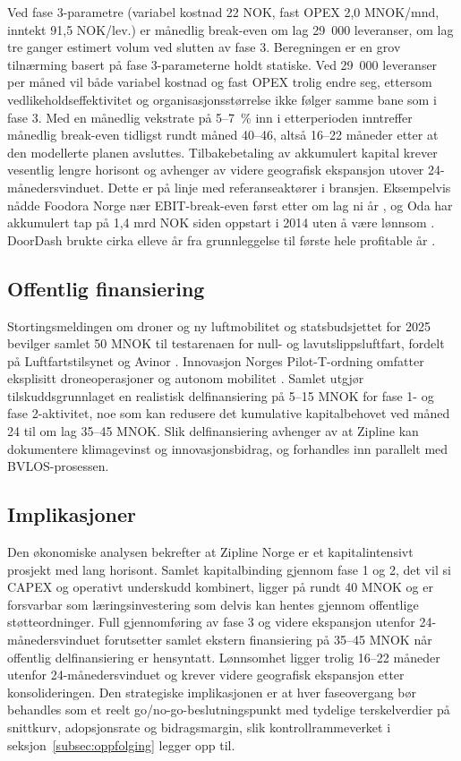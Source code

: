 Ved fase 3-parametre (variabel kostnad 22 NOK, fast OPEX 2{,}0 MNOK/mnd,
inntekt 91{,}5 NOK/lev.) er månedlig break-even om lag 29~000
leveranser, om lag tre ganger estimert volum ved slutten av fase 3.
Beregningen er en grov tilnærming basert på fase 3-parameterne holdt
statiske. Ved 29~000 leveranser per måned vil både variabel kostnad og
fast OPEX trolig endre seg, ettersom vedlikeholdseffektivitet og
organisasjonsstørrelse ikke følger samme bane som i fase 3. Med en
månedlig vekstrate på 5--7~\% inn i etterperioden inntreffer månedlig
break-even tidligst rundt måned 40--46, altså 16--22 måneder etter at
den modellerte planen avsluttes. Tilbakebetaling av akkumulert
kapital krever vesentlig lengre horisont og avhenger av videre
geografisk ekspansjon utover 24-måneders\-vinduet. Dette er på linje med
referanseaktører i bransjen. Eksempelvis nådde Foodora Norge nær
EBIT-break-even først etter om lag ni år
\parencite{purehelp2025_foodora}, og Oda har akkumulert tap på 1{,}4 mrd
NOK siden oppstart i 2014 uten å være lønnsom
\parencite{finansavisen2024_oda}. DoorDash brukte cirka elleve år fra
grunnleggelse til første hele profitable år \parencite{doordash2025}.

\subsection{Offentlig finansiering}

Stortingsmeldingen om droner og ny luftmobilitet og statsbudsjettet for
2025 bevilger samlet 50 MNOK til testarenaen for null- og
lavutslipps\-luftfart, fordelt på Luftfartstilsynet og Avinor
\parencite{prop1s2024, parat24_2024}. Innovasjon Norges Pilot-T-ordning
omfatter eksplisitt droneoperasjoner og autonom mobilitet
\parencite{innovasjonnorge2025_pilott}. Samlet utgjør
tilskudds\-grunnlaget en realistisk delfinansiering på 5--15 MNOK for
fase 1- og fase 2-aktivitet, noe som kan redusere det kumulative
kapital\-behovet ved måned 24 til om lag 35--45 MNOK. Slik
delfinansiering avhenger av at Zipline kan dokumentere klima\-gevinst
og innovasjons\-bidrag, og forhandles inn parallelt med BVLOS-prosessen.

\subsection{Implikasjoner}

Den økonomiske analysen bekrefter at Zipline Norge er et
kapital\-intensivt prosjekt med lang horisont. Samlet kapitalbinding
gjennom fase 1 og 2, det vil si CAPEX og operativt underskudd kombinert,
ligger på rundt 40 MNOK og er forsvarbar som lærings\-investering som
delvis kan hentes gjennom offentlige støtteordninger. Full gjennomføring av fase 3 og videre ekspansjon
utenfor 24-måneders\-vinduet forutsetter samlet ekstern finansiering på
35--45 MNOK når offentlig delfinansiering er hensyntatt. Lønnsomhet
ligger trolig 16--22 måneder utenfor 24-måneders\-vinduet og krever
videre geografisk ekspansjon etter konsolideringen. Den strategiske
implikasjonen er at hver faseovergang bør behandles som et reelt
go/no-go-beslutnings\-punkt med tydelige terskel\-verdier på snittkurv,
adopsjons\-rate og bidrags\-margin, slik kontroll\-rammeverket i
seksjon~\ref{subsec:oppfolging} legger opp til.
